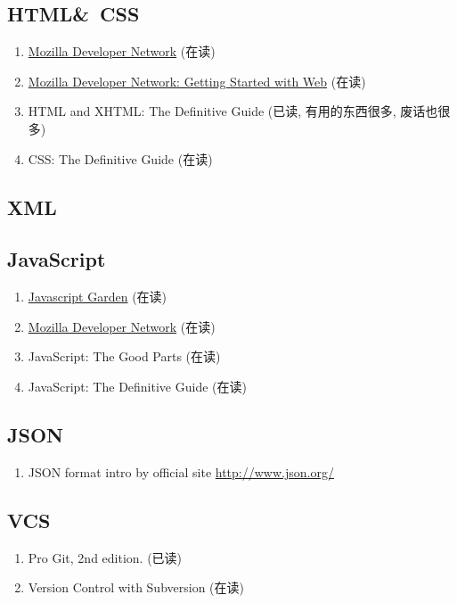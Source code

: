 \documentclass{article}
\begin{document}
\subsection{HTML\&\ CSS}
\begin{enumerate}
    \item \href{https://developer.mozilla.org/en-US/Learn}{Mozilla Developer Network} (在读)
    \item \href{https://developer.mozilla.org/en-US/Learn/Getting_started_with_the_web}{Mozilla Developer Network: Getting Started with Web} (在读)
    \item HTML and XHTML: The Definitive Guide (已读, 有用的东西很多, 废话也很多)
    \item CSS: The Definitive Guide (在读)
\end{enumerate}
%
\subsection{XML}
%
\subsection{JavaScript}
\begin{enumerate}
    \item  \href{http://bonsaiden.github.io/JavaScript-Garden/}{Javascript Garden} (在读)
    \item \href{https://developer.mozilla.org/en-US/Learn}{Mozilla Developer Network} (在读)
    \item JavaScript: The Good Parts (在读)
    \item JavaScript: The Definitive Guide (在读)
\end{enumerate}
\subsection{JSON}
\begin{enumerate}
    \item JSON format intro by official site \url{http://www.json.org/}
\end{enumerate}
\subsection{VCS}
\begin{enumerate}
    \item Pro Git, 2nd edition. (已读)
    \item Version Control with Subversion (在读)
\end{enumerate}
\end{document}
